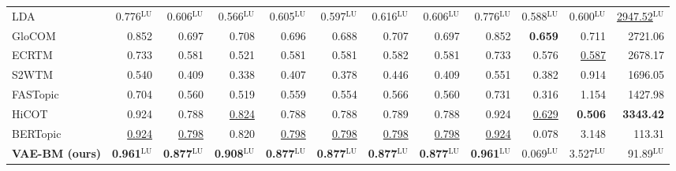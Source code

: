 \begin{table}[htb]
{\begin{tabular}{lrrrrrrrrrrr}
LDA & 0.776$^{\mathrm{LU}}$ & 0.606$^{\mathrm{LU}}$ & 0.566$^{\mathrm{LU}}$ & 0.605$^{\mathrm{LU}}$ & 0.597$^{\mathrm{LU}}$ & 0.616$^{\mathrm{LU}}$ & 0.606$^{\mathrm{LU}}$ & 0.776$^{\mathrm{LU}}$ & 0.588$^{\mathrm{LU}}$ & 0.600$^{\mathrm{LU}}$ & \underline{2947.52}$^{\mathrm{LU}}$ \\
GloCOM & 0.852 & 0.697 & 0.708 & 0.696 & 0.688 & 0.707 & 0.697 & 0.852 & \textbf{0.659} & 0.711 & 2721.06 \\
ECRTM & 0.733 & 0.581 & 0.521 & 0.581 & 0.581 & 0.582 & 0.581 & 0.733 & 0.576 & \underline{0.587} & 2678.17 \\
S2WTM & 0.540 & 0.409 & 0.338 & 0.407 & 0.378 & 0.446 & 0.409 & 0.551 & 0.382 & 0.914 & 1696.05 \\
FASTopic & 0.704 & 0.560 & 0.519 & 0.559 & 0.554 & 0.566 & 0.560 & 0.731 & 0.316 & 1.154 & 1427.98 \\
HiCOT & 0.924 & 0.788 & \underline{0.824} & 0.788 & 0.788 & 0.789 & 0.788 & 0.924 & \underline{0.629} & \textbf{0.506} & \textbf{3343.42} \\
BERTopic & \underline{0.924} & \underline{0.798} & 0.820 & \underline{0.798} & \underline{0.798} & \underline{0.798} & \underline{0.798} & \underline{0.924} & 0.078 & 3.148 & 113.31 \\
\midrule
\textbf{VAE-BM (ours)} & \textbf{0.961}$^{\mathrm{LU}}$ & \textbf{0.877}$^{\mathrm{LU}}$ & \textbf{0.908}$^{\mathrm{LU}}$ & \textbf{0.877}$^{\mathrm{LU}}$ & \textbf{0.877}$^{\mathrm{LU}}$ & \textbf{0.877}$^{\mathrm{LU}}$ & \textbf{0.877}$^{\mathrm{LU}}$ & \textbf{0.961}$^{\mathrm{LU}}$ & 0.069$^{\mathrm{LU}}$ & 3.527$^{\mathrm{LU}}$ & 91.89$^{\mathrm{LU}}$ \\
\bottomrule
\end{tabular}
}
\end{table}
